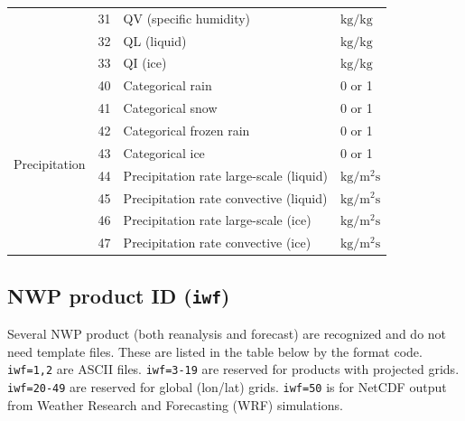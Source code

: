 \documentclass[11pt]{article}   %
\begin{document}
\begin{table}[h]
\begin{tabular}{| r | l | l | l |}
  & 31 & QV (specific humidity) & $\mathrm{kg/kg}$ \\
  & 32 & QL (liquid) & $\mathrm{kg/kg}$ \\
  & 33 & QI (ice) & $\mathrm{kg/kg}$ \\
\hline
\multirow{8}{*}{Precipitation}
  & 40 & Categorical rain & 0 or 1 \\
  & 41 & Categorical snow & 0 or 1 \\
  & 42 & Categorical frozen rain & 0 or 1 \\
  & 43 & Categorical ice & 0 or 1 \\
  & 44 & Precipitation rate large-scale (liquid) & $\mathrm{kg/m^2s}$ \\
  & 45 & Precipitation rate convective  (liquid) & $\mathrm{kg/m^2s}$ \\
  & 46 & Precipitation rate large-scale (ice) & $\mathrm{kg/m^2s}$ \\
  & 47 & Precipitation rate convective  (ice) & $\mathrm{kg/m^2s}$ \\
\hline
\end{tabular}
\normalsize
\end{table}

\clearpage
\subsection{NWP product ID (\texttt{iwf})}\label{Apiwf}
Several NWP product (both reanalysis and forecast) are recognized
and do not need template files.  These are listed in the table below
by the format code.  \texttt{iwf=1,2} are ASCII files.
\texttt{iwf=3-19} are reserved for products with projected grids.
\texttt{iwf=20-49} are reserved for global (lon/lat) grids.
\texttt{iwf=50} is for NetCDF output from Weather Research and 
Forecasting (WRF) simulations.
\end{document}
